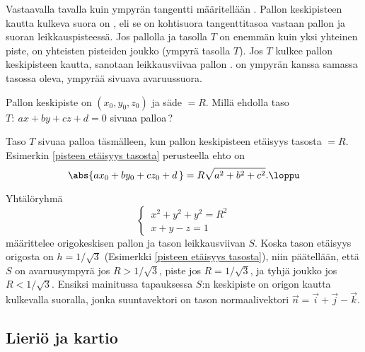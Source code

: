 Vastaavalla tavalla kuin ympyrän tangentti määritellään
%
. Pallon keskipisteen kautta kulkeva suora on
%
, eli se on kohtisuora tangenttitasoa
vastaan pallon ja suoran leikkauspisteessä. Jos pallolla ja tasolla $T$ on enemmän kuin yksi 
yhteinen piste, on yhteisten pisteiden joukko
%
 (ympyrä tasolla $T$). Jos $T$
kulkee pallon keskipisteen kautta, sanotaan leikkausviivaa pallon
%
.
 on ympyrän kanssa samassa tasossa oleva, ympyrää sivuava
avaruussuora.
\begin{Exa} Pallon keskipiste on $(x_0,y_0,z_0)$ ja säde $=R$. Millä ehdolla taso 
$T:\ ax+by+cz+d=0$ sivuaa palloa\,?
\end{Exa}
\ratk Taso $T$ sivuaa palloa täsmälleen, kun pallon keskipisteen etäisyys tasosta $=R$.
Esimerkin \ref{pisteen etäisyys tasosta} perusteella ehto on
\[
\abs{ax_0+by_0+cz_0+d\,} =R\sqrt{a^2+b^2+c^2}. \loppu
\]
\begin{Exa} Yhtälöryhmä
\[ \begin{cases}
\,x^2+y^2+y^2=R^2 \\ \,x+y-z=1
\end{cases} \]
määrittelee origokeskisen pallon ja tason leikkausviivan $S$. Koska tason etäisyys origosta on
$h=1/\sqrt{3}$ (Esimerkki \ref{pisteen etäisyys tasosta}), niin päätellään, että $S$ on 
avaruusympyrä jos $R>1/\sqrt{3}$, piste jos $R=1/\sqrt{3}$, ja tyhjä joukko jos $R<1/\sqrt{3}$.
Ensiksi mainitussa tapauksessa $S$:n keskipiste on origon kautta kulkevalla suoralla, jonka 
suuntavektori on tason normaalivektori $\vec n=\vec i+\vec j-\vec k$. \loppu
\end{Exa}

\subsection*{Lieriö ja kartio}
 

